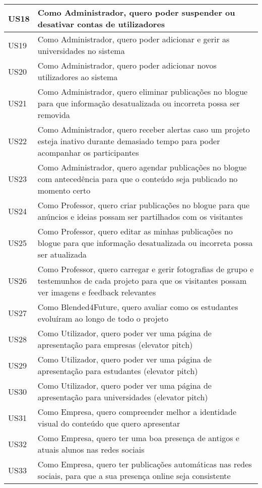 \begin{landscape}
\begin{longtable}{lp{20cm}}
    US18 & Como Administrador, quero poder suspender ou desativar contas de utilizadores \\ \hline
    US19 & Como Administrador, quero poder adicionar e gerir as universidades no sistema \\ \hline
    US20 & Como Administrador, quero poder adicionar novos utilizadores ao sistema \\ \hline
    US21 & Como Administrador, quero eliminar publicações no blogue para que informação desatualizada ou incorreta possa ser removida \\ \hline
    US22 & Como Administrador, quero receber alertas caso um projeto esteja inativo durante demasiado tempo para poder acompanhar os participantes \\ \hline
    US23 & Como Administrador, quero agendar publicações no blogue com antecedência para que o conteúdo seja publicado no momento certo \\ \hline
    US24 & Como Professor, quero criar publicações no blogue para que anúncios e ideias possam ser partilhados com os visitantes \\ \hline
    US25 & Como Professor, quero editar as minhas publicações no blogue para que informação desatualizada ou incorreta possa ser atualizada \\ \hline
    US26 & Como Professor, quero carregar e gerir fotografias de grupo e testemunhos de cada projeto para que os visitantes possam ver imagens e feedback relevantes \\ \hline
    US27 & Como Blended4Future, quero avaliar como os estudantes evoluíram ao longo de todo o projeto \\ \hline
    US28 & Como Utilizador, quero poder ver uma página de apresentação para empresas (elevator pitch) \\ \hline
    US29 & Como Utilizador, quero poder ver uma página de apresentação para estudantes (elevator pitch) \\ \hline
    US30 & Como Utilizador, quero poder ver uma página de apresentação para universidades (elevator pitch) \\ \hline
    US31 & Como Empresa, quero compreender melhor a identidade visual do conteúdo que quero apresentar \\ \hline
    US32 & Como Empresa, quero ter uma boa presença de antigos e atuais alunos nas redes sociais \\ \hline
    US33 & Como Empresa, quero ter publicações automáticas nas redes sociais, para que a sua presença online seja consistente \\ \hline

\end{longtable}
\end{landscape}

